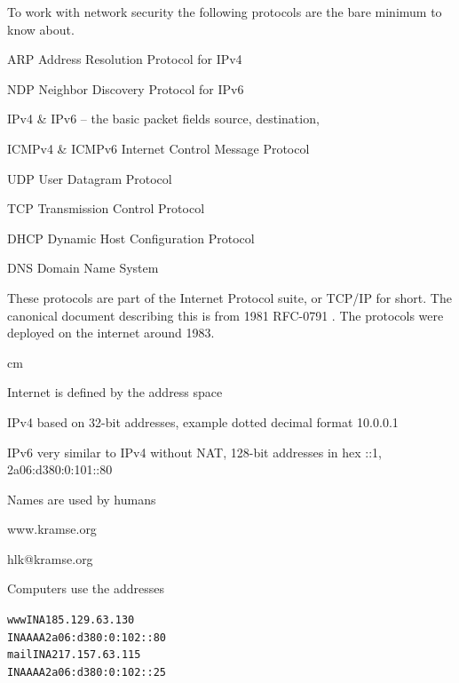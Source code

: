 \documentclass[Screen16to9,17pt]{foils}
\begin{document}

To work with network security the following protocols are the bare minimum to know about.

\begin{list2}
\item ARP Address Resolution Protocol for IPv4
\item NDP Neighbor Discovery Protocol for IPv6
\item IPv4 \& IPv6 -- the basic packet fields source, destination,
\item ICMPv4 \& ICMPv6 Internet Control Message Protocol
\item UDP User Datagram Protocol
\item TCP Transmission Control Protocol
\item DHCP Dynamic Host Configuration Protocol
\item DNS Domain Name System
\end{list2}

These protocols are part of the Internet Protocol suite, or TCP/IP for short. The canonical document describing this is from 1981 RFC-0791 . The protocols were deployed on the internet around 1983.



 cm

\begin{list2}
\item Internet is defined by the address space
\item IPv4 based on 32-bit addresses, example dotted decimal format 10.0.0.1
\item IPv6 very similar to IPv4 without NAT, 128-bit addresses in hex ::1, 2a06:d380:0:101::80
\end{list2}



Names are used by humans
\begin{center}\hlkbig
www.kramse.org

hlk@kramse.org
\end{center}

Computers use the addresses

\begin{alltt}
www     IN      A       185.129.63.130
        IN      AAAA    2a06:d380:0:102::80
mail    IN      A       217.157.63.115
        IN      AAAA    2a06:d380:0:102::25
\end{alltt}
\end{document}
